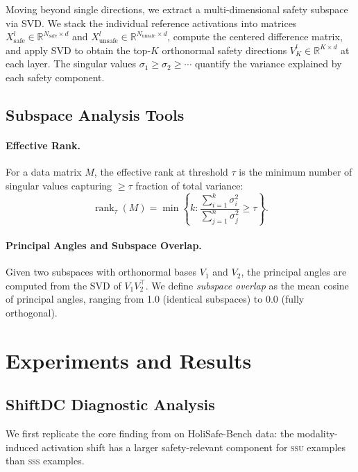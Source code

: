 \documentclass{article}
\newcommand{\ssu}{\textsc{ssu}}
\newcommand{\sss}{\textsc{sss}}
\begin{document}
Moving beyond single directions, we extract a multi-dimensional safety subspace
via SVD.  We stack the individual reference activations into matrices
$X_{\mathrm{safe}}^l \in \mathbb{R}^{N_{\mathrm{safe}} \times d}$ and
$X_{\mathrm{unsafe}}^l \in \mathbb{R}^{N_{\mathrm{unsafe}} \times d}$, compute
the centered difference matrix, and apply SVD to obtain the top-$K$ orthonormal
safety directions $V_K^l \in \mathbb{R}^{K \times d}$ at each layer.  The
singular values $\sigma_1 \geq \sigma_2 \geq \cdots$ quantify the variance
explained by each safety component.

\subsection{Subspace Analysis Tools}

\paragraph{Effective Rank.}
For a data matrix $M$, the effective rank at threshold $\tau$ is the minimum
number of singular values capturing $\geq \tau$ fraction of total variance:
\begin{equation}
  \operatorname{rank}_\tau(M) =
    \min\!\left\{k : \frac{\sum_{i=1}^{k}\sigma_i^2}{\sum_{j=1}^{n}\sigma_j^2}
    \geq \tau\right\}.
  \label{eq:eff_rank}
\end{equation}

\paragraph{Principal Angles and Subspace Overlap.}
Given two subspaces with orthonormal bases $V_1$ and $V_2$, the principal angles
are computed from the SVD of $V_1 V_2^\top$.  We define \emph{subspace overlap}
as the mean cosine of principal angles, ranging from 1.0 (identical subspaces)
to 0.0 (fully orthogonal).

\section{Experiments and Results}
\label{sec:experiments}

\subsection{ShiftDC Diagnostic Analysis}
\label{sec:shiftdc}

We first replicate the core finding from \citet{zou2025shiftdc} on HoliSafe-Bench
data: the modality-induced activation shift has a larger safety-relevant component
for \ssu{} examples than \sss{} examples.
\end{document}
